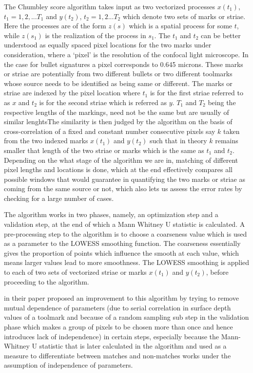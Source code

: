 \documentclass[12pt]{article}
\begin{document}
The Chumbley score algorithm takes input as two vectorized processes
\(x(t_1)\), \(t_1 = 1,2,...T_1\) and \(y(t_2)\), \(t_2 = 1,2...T_2\)
which denote two sets of marks or striae. Here the processes are of the
form \(z(s)\) which is a spatial process for some \(t\), while
\(z(s_1)\) is the realization of the process in \(s_1\). The \(t_1\) and
\(t_2\) can be better understood as equally spaced pixel locations for
the two marks under consideration, where a `pixel' is the resolution of
the confocal light microscope. In the case for bullet signatures a pixel
corresponds to 0.645 microns. These marks or striae are potentially from
two different bullets or two different toolmarks whose source needs to
be identified as being same or different. The marks or striae are
indexed by the pixel location where \(t_1\) is for the first striae
referred to as \(x\) and \(t_2\) is for the second striae which is
referred as \(y\). \(T_1\) and \(T_2\) being the respective lengths of
the markings, need not be the same but are usually of similar lenghtsThe
similarity is then judged by the algorithm on the basis of
cross-correlation of a fixed and constant number consecutive pixels say
\(k\) taken from the two indexed marks \(x(t_1)\) and \(y(t_2)\) such
that in theory \(k\) remains smaller that length of the two striae or
marks which is the same as \(t_1\) and \(t_2\). Depending on the what
stage of the algorithm we are in, matching of different pixel lengths
and locations is done, which at the end effectively compares all
possible windows that would guarantee in quantifying the two marks or
striae as coming from the same source or not, which also lets us assess
the error rates by checking for a large number of cases.

The algorithm works in two phases, namely, an optimization step and a
validation step, at the end of which a Mann Whitney U statistic is
calculated. A pre-processing step to the algorithm is to choose a
coarseness value which is used as a parameter to the LOWESS smoothing
function. The coarseness essentially gives the proportion of points
which influence the smooth at each value, which means larger values lead
to more smoothness. The LOWESS smoothing is applied to each of two sets
of vectorized striae or marks \(x(t_1)\) and \(y(t_2)\), before
proceeding to the algorithm.

\citet{hadler} in their paper proposed an improvement to this algorithm
by trying to remove mutual dependence of parameters (due to serial
correlation in surface depth values of a toolmark and because of a
random sampling sub step in the validation phase which makes a group of
pixels to be chosen more than once and hence introduces lack of
independence) in certain steps, especially because the Mann-Whitney U
statistic that is later calculated in the algorithm and used as a
measure to differentiate between matches and non-matches works under the
assumption of independence of parameters.
\end{document}
